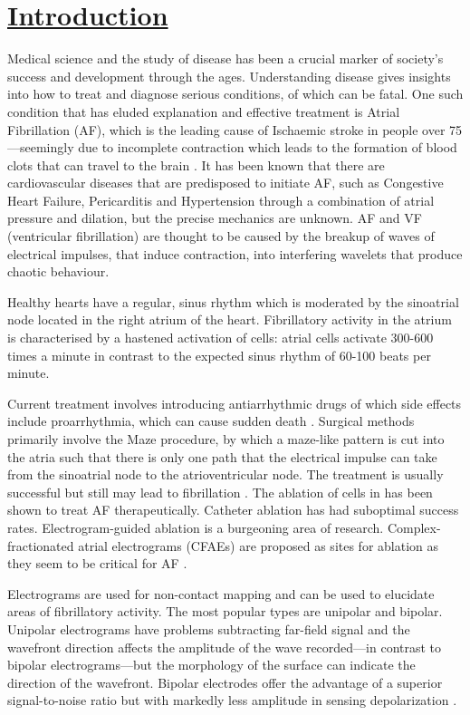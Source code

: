 \documentclass[twocolumn, a1paper]{article}
\begin{document}
\section{\textbf{\underline{Introduction}}}

Medical science and the study of disease has been a crucial marker of society's success and development through the ages. Understanding disease gives insights into how to treat and diagnose serious conditions, of which can be fatal. One such condition that has eluded explanation and effective treatment is Atrial Fibrillation (AF), which is the leading cause of Ischaemic stroke in people over 75---seemingly due to incomplete contraction which leads to the formation of blood clots that can travel to the brain \cite{Hart}. It has been known that there are cardiovascular diseases that are predisposed to initiate AF, such as Congestive Heart Failure, Pericarditis and Hypertension through a combination of atrial pressure and dilation, but the precise mechanics are unknown. AF and VF (ventricular fibrillation) are thought to be caused by the breakup of waves of electrical impulses, that induce contraction, into interfering wavelets that produce chaotic behaviour. 

Healthy hearts have a regular, sinus  rhythm which is moderated by the sinoatrial node located in the right atrium of the heart. Fibrillatory activity in the atrium is characterised by a hastened activation of cells: atrial cells activate 300-600 times a minute in contrast to the expected sinus rhythm of 60-100 beats per minute.%

Current treatment involves introducing antiarrhythmic drugs of which side effects include proarrhythmia, which can cause sudden death \cite{Nattel1}. Surgical methods primarily involve the Maze procedure, by which a maze-like pattern is cut into the atria such that there is only one path that the electrical impulse can take from the sinoatrial node to the atrioventricular node. The treatment is usually successful but still may lead to fibrillation \cite{Tsui}. The ablation of cells in has been shown to treat AF therapeutically. Catheter ablation has had suboptimal success rates. Electrogram-guided ablation is a burgeoning area of research. Complex-fractionated atrial electrograms (CFAEs) are proposed as sites for ablation as they seem to be critical for AF \cite{Greek}. %

Electrograms are used for non-contact mapping and can be used to elucidate areas of fibrillatory activity. The most popular types are unipolar and bipolar. Unipolar electrograms have problems subtracting far-field signal and the wavefront direction affects the amplitude of the wave recorded---in contrast to bipolar electrograms---but the morphology of the surface can indicate the direction of the wavefront. Bipolar electrodes offer the advantage of a superior signal-to-noise ratio but with markedly less amplitude in sensing depolarization \cite{Vincent}. 
\end{document}
